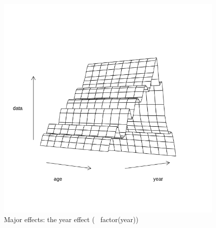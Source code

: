 \documentclass[a4paper,english,10pt]{article}\usepackage[]{graphicx}\usepackage[]{color}
\newenvironment{knitrout}{}{} %
\begin{document}
\begin{knitrout}
\color{fgcolor}\begin{figure}[H]

{\centering \includegraphics[width=.9\linewidth]{figure/majeffy-1} 

}

\caption[Major effects]{Major effects: the year effect (~ factor(year))}\label{fig:majeffy}
\end{figure}


\end{knitrout}
\end{document}
